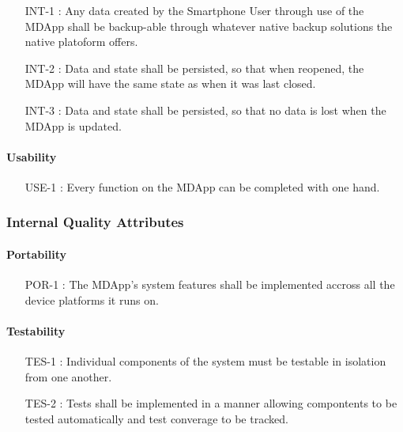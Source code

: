                 \begin{itemize}[leftmargin=1.4cm]
                    \item[INT-1 :] Any data created by the Smartphone User through use of the MDApp shall be backup-able through whatever native backup solutions the native platoform offers.
                    \item[INT-2 :] Data and state shall be persisted, so that when reopened, the MDApp will have the same state as when it was last closed.
                    \item[INT-3 :] Data and state shall be persisted, so that no data is lost when the MDApp is updated.
                \end{itemize}

            \paragraph{Usability}

                \begin{itemize}[leftmargin=1.4cm]
                    \item[USE-1 :] Every function on the MDApp can be completed with one hand.
                \end{itemize}

        \subsubsection{Internal Quality Attributes}

            \paragraph{Portability}

                \begin{itemize}[leftmargin=1.4cm]
                    \item[POR-1 :] The MDApp's system features shall be implemented accross all the device platforms it runs on.
                \end{itemize}

            \paragraph{Testability}

                \begin{itemize}[leftmargin=1.4cm]
                    \item[TES-1 :] Individual components of the system must be testable in isolation from one another.
                    \item[TES-2 :] Tests shall be implemented in a manner allowing compontents to be tested automatically and test converage to be tracked.
                \end{itemize}


